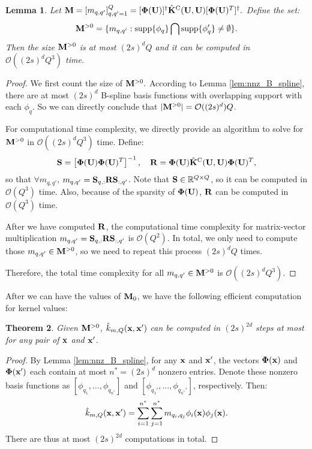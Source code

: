 \documentclass[aos,preprint]{imsart}
\theoremstyle{plain}
\newtheorem{theorem}{Theorem}[section]
\newtheorem{lemma}[theorem]{Lemma}
\newcommand{\Real}{\mathbb R}
\newcommand{\CalO}{\mathcal O}
\newcommand{\BFx}{\bold x}
\newcommand{\BU}{\bold U}
\newcommand{\BK}{\bold K}
\newcommand{\BPhi}{\boldsymbol{\Phi}}
\theoremstyle{remark}
\begin{document}
\begin{appendix}
\begin{lemma}
    \label{lem:time_complexity_sparse_M}
     Let $\mathbf{M} = [m_{q,q'}]_{q,q'=1}^Q = [\BPhi(\BU)]^\dagger \hat{\BK}^{\rm C}(\BU, \BU) [\BPhi(\BU)^T]^\dagger.$ Define the set:
     \[\mathbf{M}^{>0}=\{m_{q,q'}:  {\rm supp}\{\phi_q\}\bigcap   {\rm supp}\{\phi_q'\}\neq \emptyset\}.\]
     Then the size $\bold{M}^{>0}$ is at most $(2s)^dQ$ and it can be computed in $\CalO((2s)^dQ^3)$ time.
\end{lemma}
\begin{proof}
    We first count the size of $\bold{M}^{>0}.$ According to Lemma \ref{lem:nnz_B_spline}, there are at most $(2s)^d$ B-spline basis functions with overlapping support with each $\phi_q$. So we can directly conclude that $|\bold{M}^{>0}|=\CalO((2s)^d)Q$. 
    
    For computational time complexity, we directly provide an algorithm to solve for $\bold{M}^{>0}$ in $\CalO((2s)^dQ^3)$ time. Define:
    \begin{align*}
        \bold{S}=\left[\BPhi(\BU)\BPhi(\BU)^T\right]^{-1},\quad \bold{R}=\BPhi(\BU) \hat{\BK}^{\rm C}(\BU, \BU) \BPhi(\BU)^T,
    \end{align*}
    so that $\forall m_{q,q'}$, $ m_{q,q'}= \bold{S}_{q,:}\bold{R}\bold{S}_{:,q'}$. Note that $\bold{S}\in\Real^{Q\times Q}$, so it can be computed in $\CalO(Q^3)$ time. Also, because of the sparsity of $ \BPhi(\BU)$, $\bold{R}$ can be computed in $\CalO(Q^3)$ time. 
    
    After we have computed $\bold{R}$, the computational time complexity for matrix-vector multiplication $m_{q,q'}=\bold{S}_{q,:}\bold{R}\bold{S}_{:,q'}$ is $\CalO(Q^2)$. In total, we only need to compute those $m_{q,q'}\in\bold{M}^{>0}$, so we need to repeat this process $(2s)^dQ$ times.

    Therefore, the total time complexity for all $m_{q,q'}\in\bold{M}^{>0}$ is $\CalO((2s)^dQ^3)$.
\end{proof}
After we can have the values of $\bold{M}_0$, we have the following efficient computation for kernel values:

\begin{theorem}
    \label{thm:time_complexity_kernel}Given $\bold{M}^{>0}$,  $\hat{k}_{m,Q}(\BFx, \BFx') $ can be computed in $(2s)^{2d}$ steps at most for any pair of $\BFx$ and $\BFx'$.
\end{theorem}
\begin{proof}
    By Lemma \ref{lem:nnz_B_spline}, for any $\BFx$ and $\BFx'$, the vectors $\BPhi(\BFx)$ and $\BPhi(\BFx')$ each contain at most $n^* = (2s)^d$ nonzero entries. Denote these nonzero basis functions as $[\phi_{q_1}, \ldots, \phi_{q_{n^*}}]$ and $[\phi_{q_1'}, \ldots, \phi_{q_{n^*}'}]$, respectively. Then:
    \[\hat{k}_{m,Q}(\BFx, \BFx')=\sum_{i=1}^{n^*}\sum_{j=1}^{n^*}m_{q_i,q_j}\phi_i(\BFx)\phi_j(\BFx).\]
    There are thus at most $(2s)^{2d}$ computations in total.
\end{proof}
\end{appendix}
\end{document}
